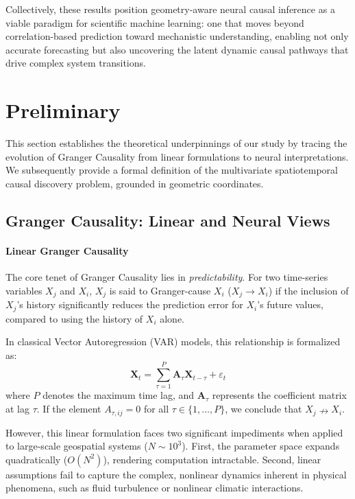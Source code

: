 \documentclass{article}
\begin{document}
Collectively, these results position geometry-aware neural causal inference as a viable paradigm for scientific machine learning: one that moves beyond correlation-based prediction toward mechanistic understanding, enabling not only accurate forecasting but also uncovering the latent dynamic causal pathways that drive complex system transitions.

\section{Preliminary}
\label{sec:preliminary}

This section establishes the theoretical underpinnings of our study by tracing the evolution of Granger Causality from linear formulations to neural interpretations. We subsequently provide a formal definition of the multivariate spatiotemporal causal discovery problem, grounded in geometric coordinates.

\subsection{Granger Causality: Linear and Neural Views}

\paragraph{Linear Granger Causality}
The core tenet of Granger Causality lies in \textit{predictability}. For two time-series variables $X_j$ and $X_i$, $X_j$ is said to Granger-cause $X_i$ ($X_j \to X_i$) if the inclusion of $X_j$'s history significantly reduces the prediction error for $X_i$'s future values, compared to using the history of $X_i$ alone.

In classical Vector Autoregression (VAR) models, this relationship is formalized as:
\begin{equation}
    \mathbf{X}_t = \sum_{\tau=1}^P \mathbf{A}_\tau \mathbf{X}_{t-\tau} + \varepsilon_t
\end{equation}
where $P$ denotes the maximum time lag, and $\mathbf{A}_\tau$ represents the coefficient matrix at lag $\tau$. If the element $A_{\tau, ij} = 0$ for all $\tau \in \{1, \dots, P\}$, we conclude that $X_j \nrightarrow X_i$.

However, this linear formulation faces two significant impediments when applied to large-scale geospatial systems ($N \sim 10^3$). First, the parameter space expands quadratically ($O(N^2)$), rendering computation intractable. Second, linear assumptions fail to capture the complex, nonlinear dynamics inherent in physical phenomena, such as fluid turbulence or nonlinear climatic interactions.
\end{document}
